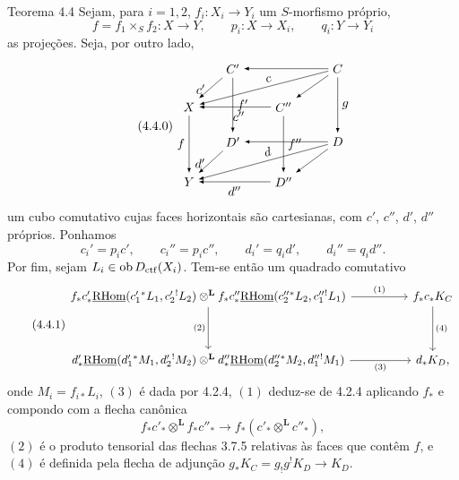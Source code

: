 \begin{statement}{Teorema 4.4}
Sejam, para $i=1,2$, $f_i:X_i\longrightarrow Y_i$ um $S$-morfismo próprio,
\[
f=f_1\times_S f_2:X\longrightarrow Y,\qquad
p_i:X\longrightarrow X_i,\qquad q_i:Y\longrightarrow Y_i
\]
as projeções. Seja, por outro lado,
\begin{equation}
\tag{4.4.0}
\begin{tikzpicture}[>=latex,baseline=(current bounding box.center),scale=0.98]
\node (Cp) at (0,2.1) {$C'$};
\node (C) at (3.0,2.1) {$C$};
\node (X) at (-1.25,1.0) {$X$};
\node (Cpp) at (1.45,1.0) {$C''$};
\node (Dp) at (0,0) {$D'$};
\node (D) at (3.0,0) {$D$};
\node (Y) at (-1.25,-1.15) {$Y$};
\node (Dpp) at (1.45,-1.15) {$D''$};
\draw[->] (C) -- (Cp);
\draw[->] (Cp) -- node[left,pos=.55] {$c'$} (X);
\draw[->] (C) -- node[above,sloped,pos=.45] {$c$} (X);
\draw[->] (C) -- (Cpp);
\draw[->] (Cpp) -- node[below,pos=.45] {$c''$} (X);
\draw[->] (Cp) -- node[right] {$f'$} (Dp);
\draw[->] (Cpp) -- node[right] {$f''$} (Dpp);
\draw[->] (C) -- node[right] {$g$} (D);
\draw[->] (X) -- node[left] {$f$} (Y);
\draw[->] (D) -- (Dp);
\draw[->] (Dp) -- node[left,pos=.55] {$d'$} (Y);
\draw[->] (D) -- node[above,sloped,pos=.45] {$d$} (Y);
\draw[->] (D) -- (Dpp);
\draw[->] (Dpp) -- node[below] {$d''$} (Y);
\end{tikzpicture}
\end{equation}
um cubo comutativo cujas faces horizontais são cartesianas, com $c'$, $c''$, $d'$, $d''$ próprios. Ponhamos
\[
c_i'=p_i c',\qquad c_i''=p_i c'',\qquad d_i'=q_i d',\qquad d_i''=q_i d''.
\]
Por fim, sejam $L_i\in\operatorname{ob} D_{\mathrm{ctf}}(X_i)$. Tem-se então um quadrado comutativo
\begin{equation}
\tag{4.4.1}
\begin{tikzcd}[column sep=huge,row sep=huge]
f_*c'_*\uRHom(c_1'{}^*L_1,c_2'{}^!L_2)\otimes^{\mathbf L}
f_*c''_*\uRHom(c_2''{}^*L_2,c_1''{}^!L_1)
 \arrow[r,"(1)"] \arrow[d,"(2)"'] &
f_*c_*K_C \arrow[d,"(4)"] \\
d'_*\uRHom(d_1'{}^*M_1,d_2'{}^!M_2)\otimes^{\mathbf L}
d''_*\uRHom(d_2''{}^*M_2,d_1''{}^!M_1)
 \arrow[r,"(3)"'] &
d_*K_D ,
\end{tikzcd}
\end{equation}
onde $M_i=f_{i*}L_i$, $(3)$ é dada por 4.2.4, $(1)$ deduz-se de 4.2.4 aplicando $f_*$ e compondo com a flecha canônica
\[
f_*c'_*\otimes^{\mathbf L} f_*c''_*\longrightarrow f_*(c'_*\otimes^{\mathbf L}c''_*),
\]
$(2)$ é o produto tensorial das flechas 3.7.5 relativas às faces que contêm $f$, e $(4)$ é definida pela flecha de adjunção $g_*K_C=g_!g^!K_D\longrightarrow K_D$.
\end{statement}

